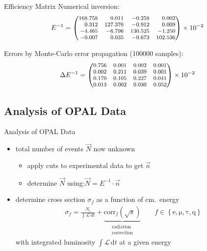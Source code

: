 \documentclass[11pt,xcolor=dvipsnames,professionalfonts]{beamer}
\begin{document}
\begin{frame}{Efficiency Matrix}
	Numerical inversion:
	\begin{align*}
	\footnotesize
	E^{-1} = \begin{pmatrix*}[r]
	168.758 & 0.011 &-0.258 & 0.002 \\
	0.312 & 127.376 &-0.912 & 0.009 \\
	-4.465 &-6.796 & 130.525 &-1.250 \\
	-0.007 & 0.035 &-0.673 & 102.536 \\
	\end{pmatrix*} \times 10^{-2}
	\end{align*}
	
	\vspace{0.5cm}
	
	Errors by Monte-Carlo error propagation (\num{100000} samples):
	\begin{align*}
	\footnotesize
	\Delta E^{-1} = \begin{pmatrix}
	0.756 & 0.001 & 0.002 & 0.001 \\
	0.002 & 0.211 & 0.039 & 0.001 \\
	0.170 & 0.105 & 0.227 & 0.041 \\
	0.013 & 0.002 & 0.030 & 0.052 \\
	\end{pmatrix} \times 10^{-2}
	\end{align*}
\end{frame}

\subsection{Analysis of OPAL Data}

\begin{frame}{Analysis of OPAL Data}
	\begin{itemize}
		\setlength\itemsep{2em}
		\item total number of events $\vec{N}$ now unknown
		\begin{itemize}
			\setlength\itemsep{.5em}
			\item apply cuts to experimental data to get $\vec{n}$
			\item determine $\vec{N}$ using:\quad $\vec{N} = E^{-1} \cdot \vec{n}$
		\end{itemize}
		
		\pause
		
		\item determine cross section $\sigma_f$ as a function of cm.\ energy
			\begin{align*}
				\sigma_f = \frac{N_i}{\int \mathcal{L} \, \mathrm{d}t} + \underbrace{\mathrm{corr}_f(\sqrt{s})}_{\substack{\text{radiation} \\ \text{correction}}} \qquad f \in \left\{ \mathrm{e}, \mathrm{\mu}, \mathrm{\tau}, \mathrm{q} \right\}
			\end{align*}
		with integrated luminosity $\int \mathcal{L} \, \mathrm{d}t$ at a given energy		
	\end{itemize}
\end{frame}
\end{document}
